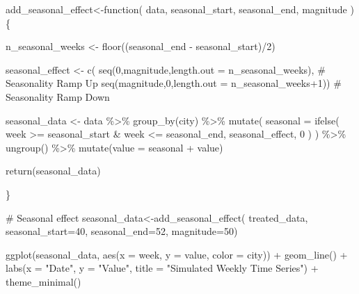 \documentclass[
  letterpaper,
  DIV=11,
  numbers=noendperiod]{scrreprt}
\newenvironment{Shaded}{\begin{snugshade}}{\end{snugshade}}
\newcommand{\AttributeTok}[1]{\textcolor[rgb]{0.40,0.45,0.13}{#1}}
\newcommand{\CommentTok}[1]{\textcolor[rgb]{0.37,0.37,0.37}{#1}}
\newcommand{\ControlFlowTok}[1]{\textcolor[rgb]{0.00,0.23,0.31}{#1}}
\newcommand{\DecValTok}[1]{\textcolor[rgb]{0.68,0.00,0.00}{#1}}
\newcommand{\FunctionTok}[1]{\textcolor[rgb]{0.28,0.35,0.67}{#1}}
\newcommand{\NormalTok}[1]{\textcolor[rgb]{0.00,0.23,0.31}{#1}}
\newcommand{\OtherTok}[1]{\textcolor[rgb]{0.00,0.23,0.31}{#1}}
\newcommand{\SpecialCharTok}[1]{\textcolor[rgb]{0.37,0.37,0.37}{#1}}
\newcommand{\StringTok}[1]{\textcolor[rgb]{0.13,0.47,0.30}{#1}}
\begin{document}
\begin{Shaded}
\begin{Highlighting}[]
\NormalTok{add\_seasonal\_effect}\OtherTok{\textless{}{-}}\ControlFlowTok{function}\NormalTok{(}
\NormalTok{    data,}
\NormalTok{    seasonal\_start,}
\NormalTok{    seasonal\_end,}
\NormalTok{    magnitude}
\NormalTok{)\{}

\NormalTok{  n\_seasonal\_weeks }\OtherTok{\textless{}{-}} \FunctionTok{floor}\NormalTok{((seasonal\_end }\SpecialCharTok{{-}}\NormalTok{ seasonal\_start)}\SpecialCharTok{/}\DecValTok{2}\NormalTok{)}

\NormalTok{  seasonal\_effect }\OtherTok{\textless{}{-}} \FunctionTok{c}\NormalTok{(}
  \FunctionTok{seq}\NormalTok{(}\DecValTok{0}\NormalTok{,magnitude,}\AttributeTok{length.out =}\NormalTok{ n\_seasonal\_weeks), }\CommentTok{\# Seasonality Ramp Up}
  \FunctionTok{seq}\NormalTok{(magnitude,}\DecValTok{0}\NormalTok{,}\AttributeTok{length.out =}\NormalTok{ n\_seasonal\_weeks}\SpecialCharTok{+}\DecValTok{1}\NormalTok{)) }\CommentTok{\# Seasonality Ramp Down}


\NormalTok{  seasonal\_data }\OtherTok{\textless{}{-}}\NormalTok{ data }\SpecialCharTok{\%\textgreater{}\%}
    \FunctionTok{group\_by}\NormalTok{(city) }\SpecialCharTok{\%\textgreater{}\%}
    \FunctionTok{mutate}\NormalTok{(}
    \AttributeTok{seasonal =}  \FunctionTok{ifelse}\NormalTok{(}
\NormalTok{      week }\SpecialCharTok{\textgreater{}=}\NormalTok{ seasonal\_start }\SpecialCharTok{\&}\NormalTok{ week }\SpecialCharTok{\textless{}=}\NormalTok{ seasonal\_end,}
\NormalTok{      seasonal\_effect,}
      \DecValTok{0}
\NormalTok{      )}
\NormalTok{    ) }\SpecialCharTok{\%\textgreater{}\%}
    \FunctionTok{ungroup}\NormalTok{() }\SpecialCharTok{\%\textgreater{}\%}
    \FunctionTok{mutate}\NormalTok{(}\AttributeTok{value =}\NormalTok{ seasonal }\SpecialCharTok{+}\NormalTok{ value)}

  \FunctionTok{return}\NormalTok{(seasonal\_data)}

\NormalTok{\}}



\CommentTok{\# Seasonal effect}
\NormalTok{seasonal\_data}\OtherTok{\textless{}{-}}\FunctionTok{add\_seasonal\_effect}\NormalTok{(}
\NormalTok{  treated\_data,}
  \AttributeTok{seasonal\_start=}\DecValTok{40}\NormalTok{,}
  \AttributeTok{seasonal\_end=}\DecValTok{52}\NormalTok{,}
  \AttributeTok{magnitude=}\DecValTok{50}\NormalTok{)}



\FunctionTok{ggplot}\NormalTok{(seasonal\_data, }\FunctionTok{aes}\NormalTok{(}\AttributeTok{x =}\NormalTok{ week, }\AttributeTok{y =}\NormalTok{ value, }\AttributeTok{color =}\NormalTok{ city)) }\SpecialCharTok{+}
  \FunctionTok{geom\_line}\NormalTok{() }\SpecialCharTok{+}
  \FunctionTok{labs}\NormalTok{(}\AttributeTok{x =} \StringTok{"Date"}\NormalTok{, }\AttributeTok{y =} \StringTok{"Value"}\NormalTok{, }\AttributeTok{title =} \StringTok{"Simulated Weekly Time Series"}\NormalTok{) }\SpecialCharTok{+}
  \FunctionTok{theme\_minimal}\NormalTok{()}
\end{Highlighting}
\end{Shaded}
\end{document}
